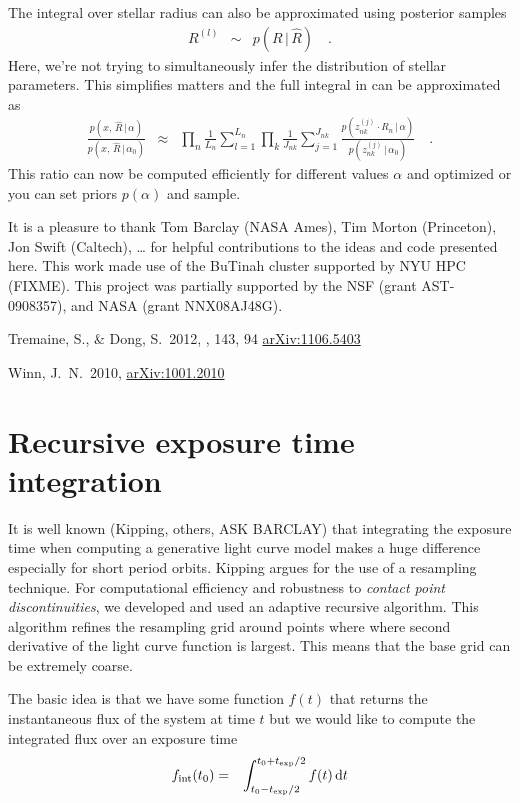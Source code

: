 \documentclass[12pt,preprint]{aastex}
\begin{document}
The integral over stellar radius can also be approximated using posterior
samples
\begin{eqnarray}
R^{(l)} &\sim& p(R\,|\,\hat{R}) \quad.
\end{eqnarray}
Here, we're not trying to simultaneously infer the distribution of stellar
parameters.
This simplifies matters and the full integral in  can be
approximated as
\begin{eqnarray}
\frac{p(x,\,\hat{R}\,|\,\alpha)}{p(x,\,\hat{R}\,|\,\alpha_0)}
&\approx& \prod_n \frac{1}{L_n} \sum_{l=1}^{L_n} \prod_k
\frac{1}{J_{nk}} \sum_{j=1}^{J_{nk}}
\frac{p(z_{nk}^{(j)}\cdot R_n\,|\,\alpha)}{p(z_{nk}^{(j)}\,|\,\alpha_0)}
\quad.
\end{eqnarray}
This ratio can now be computed efficiently for different values $\alpha$ and
optimized or you can set priors $p(\alpha)$ and sample.

\acknowledgments
It is a pleasure to thank
    Tom Barclay (NASA Ames),
    Tim Morton (Princeton),
    Jon Swift (Caltech),
    \ldots
for helpful contributions to the ideas and code presented here.
This work made use of the BuTinah cluster supported by NYU HPC (FIXME).
This project was partially supported by the NSF (grant AST-0908357), and NASA
(grant NNX08AJ48G).

\newcommand{\arxiv}[1]{\href{http://arxiv.org/abs/#1}{arXiv:#1}}
\begin{thebibliography}{}\raggedright

Tremaine, S., \& Dong, S.\ 2012, \aj, 143, 94
\arxiv{1106.5403}

Winn, J.~N.\ 2010, \arxiv{1001.2010}

\end{thebibliography}

\appendix

\section{Recursive exposure time integration}

It is well known (Kipping, others, ASK BARCLAY) that integrating the
exposure time when computing a generative light curve model makes a huge
difference especially for short period orbits.
Kipping argues for the use of a resampling technique.
For computational efficiency and robustness to \emph{contact point
discontinuities}, we developed and used an adaptive recursive algorithm.
This algorithm refines the resampling grid around points where where second
derivative of the light curve function is largest.
This means that the base grid can be extremely coarse.

The basic idea is that we have some function $f(t)$ that returns the
instantaneous flux of the system at time $t$ but we would like to compute the
integrated flux over an exposure time \texp
\begin{eqnarray}
f_\mathrm{int}(t_0) &=& \int_{t_0-t_\mathrm{exp}/2}^{t_0+t_\mathrm{exp}/2} f(t) \,\mathrm{d} t
\end{eqnarray}
\end{document}
